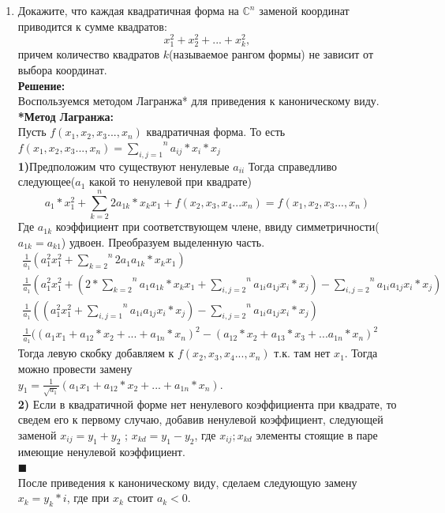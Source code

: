 \documentclass[]{book}
\theoremstyle{definition}
\begin{document}
\begin{enumerate}[resume]
\item Докажите, что каждая квадратичная форма на $\mathbb{C}^n$ заменой координат приводится к сумме квадратов:
$$x^2_1+x^2_2+...+x^2_k,$$
причем количество квадратов $k$(называемое рангом формы) не зависит от выбора координат.\\
\textbf{Решение:}\\
Воспользуемся методом Лагранжа* для приведения к каноническому виду.\\
\textbf{*Метод Лагранжа:}\\
Пусть $f(x_1,x_2,x_3...,x_n)$ квадратичная форма. То есть $f(x_1,x_2,x_3...,x_n)=\overset{n}{\underset{i,j=1}{\sum}}a_{ij}*x_i*x_j$\\ 
\textbf{1)}Предположим что существуют ненулевые $a_{ii}$
Тогда справедливо следующее($a_1$ какой то ненулевой при квадрате) 
\begin{equation*}
a_1*x_1^2+\overset{n}{\underset{k=2}{\sum}}2a_{1k}*x_kx_1+f(x_2,x_3,x_4...x_n)=f(x_1,x_2,x_3...,x_n)
\end{equation*}
Где $a_{1k}$ коэффициент при соответствующем члене, ввиду симметричности($a_{1k}=a_{k1}$) удвоен.
Преобразуем выделенную часть.
\begin{align*}
\frac{1}{a_1}(a_1^2x_1^2+\overset{n}{\underset{k=2}{\sum}}2a_1a_{1k}*x_kx_1)\\
\frac{1}{a_1}(a_1^2x_1^2+(2*\overset{n}{\underset{k=2}{\sum}}a_1a_{1k}*x_kx_1+\overset{n}{\underset{i,j=2}{\sum}}a_{1i}a_{1j}x_i*x_j)-\overset{n}{\underset{i,j=2}{\sum}}a_{1i}a_{1j}x_i*x_j) \\
\frac{1}{a_1}((a_1^2x_1^2+\overset{n}{\underset{i,j=1}{\sum}}a_{1i}a_{1j}x_i*x_j)-\overset{n}{\underset{i,j=2}{\sum}}a_{1i}a_{1j}x_i*x_j)\\
\frac{1}{a_1}((a_1x_1+a_{12}*x_2+...+a_{1n}*x_n)^2-(a_{12}*x_2+a_{13}*x_3+...a_{1n}*x_n)^2
\end{align*}
Тогда левую скобку добавляем к $f(x_2,x_3,x_4...,x_n)$ т.к. там нет $x_1$. Тогда можно провести замену\\ $y_1=\frac{1}{\sqrt{a_1}}(a_1x_1+a_{12}*x_2+...+a_{1n}*x_n)$.\\
\textbf{2)} Если в квадратичной форме нет ненулевого коэффициента при квадрате, то сведем его к первому случаю, добавив ненулевой коэффициент, следующей заменой $x_{ij}=y_1+y_2$ ; $x_{kd}=y_1-y_2$, где $x_{ij};x_{kd}$ элементы стоящие в паре имеющие ненулевой коэффициент.\\
$\blacksquare$\\
После приведения к каноническому виду, сделаем следующую замену $x_k=y_k*i$, где при $x_k$ стоит $a_k<0$.

\end{enumerate}
\end{document}
